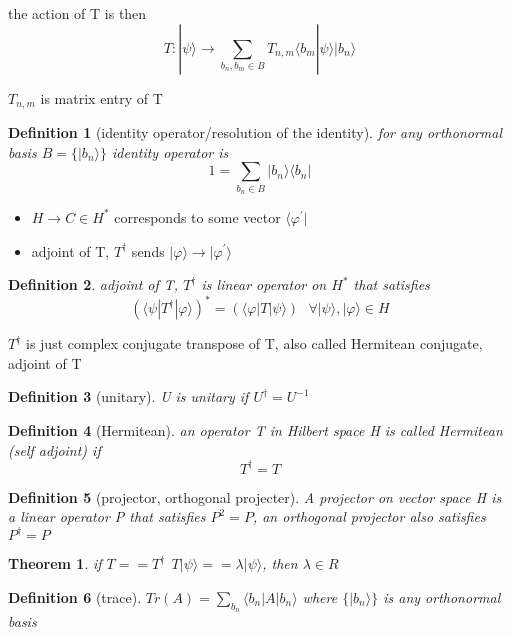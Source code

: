 \documentclass[10pt]{article}
\theoremstyle{break}
\newtheorem{thm}{Theorem}[subsection]
\newtheorem{defn}{Definition}[subsection]
\begin{document}
the action of T is then 
$$T:|\psi\rangle \rightarrow\sum_{b_n,b_m\in B}T_{n,m}\langle 
b_m|\psi\rangle|b_n\rangle$$

$T_{n,m}$ is matrix entry of T 

\begin{defn}[identity operator/resolution of the identity]
    for any orthonormal basis $B=\{|b_n\rangle\}$ identity operator is 
    $$1=\sum_{b_n\in B}|b_n\rangle\langle b_n |$$
\end{defn}

\begin{itemize}
    \item $H \rightarrow C  \in H^* $ corresponds to some vector $\langle \varphi^\prime|$
    \item adjoint of T, $T^\dagger$ sends $|\varphi\rangle \rightarrow |\varphi^\prime \rangle$
\end{itemize}

\begin{defn}
    adjoint of T, $T^\dagger$ is linear operator on $H^*$ that satisfies 
    $$(\langle\psi|T^\dagger|\varphi\rangle)^*=(\langle\varphi|T|\psi\rangle)~~~\forall|\psi\rangle, |\varphi\rangle \in H$$
    
\end{defn}

$T^\dagger$ is just complex conjugate transpose of T,
also called Hermitean conjugate, adjoint of T

\begin{defn}[unitary]
    U is unitary if $U^\dagger=U^{-1}$
\end{defn}

\begin{defn}[Hermitean]
    an operator T in Hilbert space H is called Hermitean (self adjoint) if 
    $$T^\dagger=T$$
\end{defn}

\begin{defn}[projector, orthogonal projecter]
    A projector on vector space H is a linear operator P that satisfies 
    $P^2=P$, an orthogonal projector also satisfies 
    $P^\dagger=P$
\end{defn}

\begin{thm}
    if $T==T^\dagger~~T|\psi\rangle==\lambda|\psi\rangle$, then 
    $\lambda \in R$
\end{thm}

\begin{defn}[trace]
    $Tr(A)=\sum_{b_n}\langle b_n|A|b_n\rangle$
    where $\{|b_n\rangle\}$ is any orthonormal basis
\end{defn}
\end{document}
